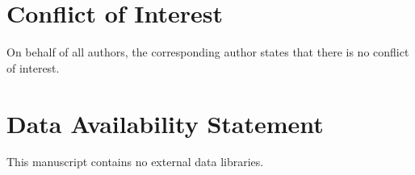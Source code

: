 \documentclass{artjltcopy}
\newcommand{\?}{\textbackslash}
\begin{document}
\section*{Conflict of Interest}
On behalf of all authors, the corresponding author states that there is no conflict of interest.
\section*{Data Availability Statement}
This manuscript contains no external data libraries.
\end{document}
